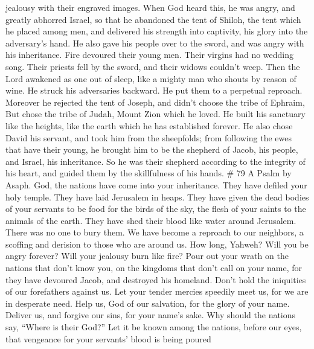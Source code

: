 jealousy with their engraved images.  When God heard this,
he was angry, and greatly abhorred Israel,  so that he
abandoned the tent of Shiloh, the tent which he placed among men,
 and delivered his strength into captivity, his glory into
the adversary's hand.  He also gave his people over to the
sword, and was angry with his inheritance.  Fire devoured
their young men. Their virgins had no wedding song.  Their
priests fell by the sword, and their widows couldn't weep. 
Then the Lord awakened as one out of sleep, like a mighty man who shouts
by reason of wine.  He struck his adversaries backward. He
put them to a perpetual reproach.  Moreover he rejected the
tent of Joseph, and didn't choose the tribe of Ephraim, 
But chose the tribe of Judah, Mount Zion which he loved. 
He built his sanctuary like the heights, like the earth which he has
established forever.  He also chose David his servant, and
took him from the sheepfolds;  from following the ewes that
have their young, he brought him to be the shepherd of Jacob, his
people, and Israel, his inheritance.  So he was their
shepherd according to the integrity of his heart, and guided them by the
skillfulness of his hands. \# 79 A Psalm by Asaph.  God, the
nations have come into your inheritance. They have defiled your holy
temple. They have laid Jerusalem in heaps.  They have given
the dead bodies of your servants to be food for the birds of the sky,
the flesh of your saints to the animals of the earth.  They
have shed their blood like water around Jerusalem. There was no one to
bury them.  We have become a reproach to our neighbors, a
scoffing and derision to those who are around us.  How long,
Yahweh? Will you be angry forever? Will your jealousy burn like fire?
 Pour out your wrath on the nations that don't know you, on
the kingdoms that don't call on your name,  for they have
devoured Jacob, and destroyed his homeland.  Don't hold the
iniquities of our forefathers against us. Let your tender mercies
speedily meet us, for we are in desperate need.  Help us,
God of our salvation, for the glory of your name. Deliver us, and
forgive our sins, for your name's sake.  Why should the
nations say, ``Where is their God?'' Let it be known among the nations,
before our eyes, that vengeance for your servants' blood is being poured
